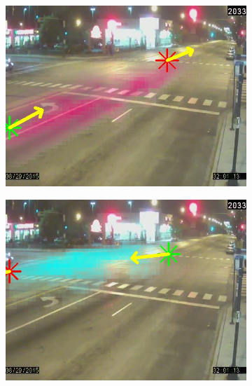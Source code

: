 \begin{figure}
    \centering
        \begin{subfigure}{0.32\linewidth}
            \includegraphics[width=\linewidth]{./img/scene_learning/res/ciceroPeterson/20150829_020000DST_ciceroPeterson-0.jpg}
        \end{subfigure}
        \begin{subfigure}{0.32\linewidth}
            \includegraphics[width=\linewidth]{./img/scene_learning/res/ciceroPeterson/20150829_020000DST_ciceroPeterson-1.jpg}
        \end{subfigure}
        \begin{subfigure}{0.32\linewidth}

\end{subfigure}
\end{figure}
